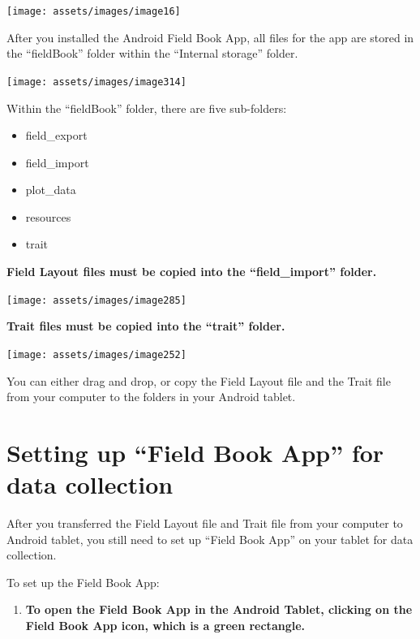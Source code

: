 \documentclass[
  12pt,
]{book}
\providecommand{\tightlist}{%
  \setlength{\itemsep}{0pt}\setlength{\parskip}{0pt}}
\begin{document}
\begin{center}\texttt{[image: assets/images/image16]} \end{center}

After you installed the Android Field Book App, all files for the app are stored in the ``fieldBook'' folder within the ``Internal storage'' folder.

\begin{center}\texttt{[image: assets/images/image314]} \end{center}

Within the ``fieldBook'' folder, there are five sub-folders:

\begin{itemize}
\item
  field\_export
\item
  field\_import
\item
  plot\_data
\item
  resources
\item
  trait
\end{itemize}

\textbf{Field Layout files must be copied into the ``field\_import'' folder.}

\begin{center}\texttt{[image: assets/images/image285]} \end{center}

\textbf{Trait files must be copied into the ``trait'' folder.}

\begin{center}\texttt{[image: assets/images/image252]} \end{center}

You can either drag and drop, or copy the Field Layout file and the Trait file from your computer to the folders in your Android tablet.

\hypertarget{setting-up-field-book-app-for-data-collection}{%
\section{Setting up ``Field Book App'' for data collection}\label{setting-up-field-book-app-for-data-collection}}

After you transferred the Field Layout file and Trait file from your computer to Android tablet, you still need to set up ``Field Book App'' on your tablet for data collection.

To set up the Field Book App:

\begin{enumerate}
\def\labelenumi{\arabic{enumi}.}
\tightlist
\item
  \textbf{To open the Field Book App in the Android Tablet, clicking on the Field Book App icon, which is a green rectangle.}
\end{enumerate}
\end{document}
